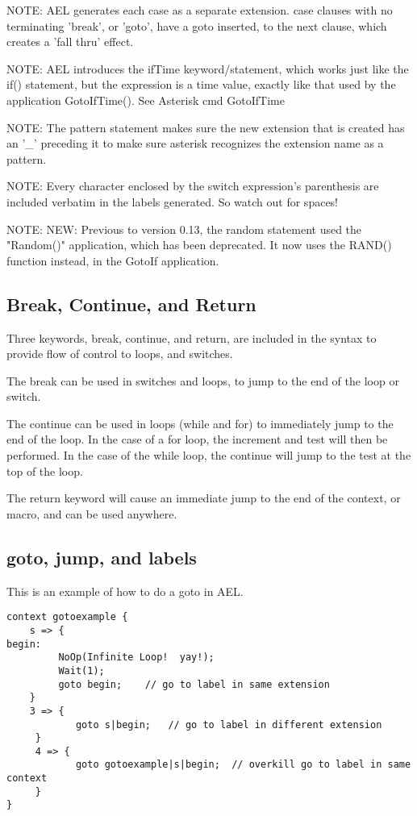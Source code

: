 {NOTE: AEL generates each case as a separate extension. case clauses
      with no terminating 'break', or 'goto', have a goto inserted, to
      the next clause, which creates a 'fall thru' effect.

NOTE: AEL introduces the ifTime keyword/statement, which works just
      like the if() statement, but the expression is a time value,
      exactly like that used by the application GotoIfTime(). See
      Asterisk cmd GotoIfTime

NOTE: The pattern statement makes sure the new extension that is
      created has an '\_' preceding it to make sure asterisk recognizes
      the extension name as a pattern.

NOTE: Every character enclosed by the switch expression's parenthesis
      are included verbatim in the labels generated. So watch out for
      spaces!

NOTE: NEW: Previous to version 0.13, the random statement used the
      "Random()" application, which has been deprecated. It now uses
      the RAND() function instead, in the GotoIf application.


\subsection{Break, Continue, and Return}

Three keywords, break, continue, and return, are included in the
syntax to provide flow of control to loops, and switches.

The break can be used in switches and loops, to jump to the end of the
loop or switch.

The continue can be used in loops (while and for) to immediately jump
to the end of the loop. In the case of a for loop, the increment and
test will then be performed. In the case of the while loop, the
continue will jump to the test at the top of the loop.

The return keyword will cause an immediate jump to the end of the
context, or macro, and can be used anywhere.



\subsection{goto, jump, and labels}

This is an example of how to do a goto in AEL.

\begin{verbatim}
context gotoexample {
    s => {
begin:
         NoOp(Infinite Loop!  yay!);
         Wait(1);
         goto begin;    // go to label in same extension
    }
    3 => {
            goto s|begin;   // go to label in different extension
     }
     4 => {
            goto gotoexample|s|begin;  // overkill go to label in same context
     }
}


\end{verbatim}}

